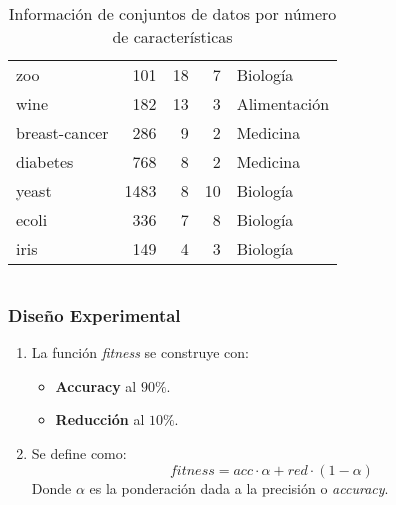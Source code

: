 \begin{frame}
\begin{columns}
\begin{table}[htp]
\begin{tabular}{ l r r r l }
        zoo              & 101            & 18            & 7             & Biología      \\
        wine             & 182            & 13            & 3             & Alimentación  \\
        breast-cancer    & 286            & 9             & 2             & Medicina      \\
        diabetes         & 768            & 8             & 2             & Medicina      \\
        yeast            & 1483           & 8             & 10            & Biología      \\
        ecoli            & 336            & 7             & 8             & Biología      \\
        iris             & 149            & 4             & 3             & Biología      \\ \hline
      \end{tabular}
      \caption{Información de conjuntos de datos por número de características}
      \label{tab:datasets_info}
    \end{table}
  \end{columns}
\end{frame}

\begin{frame}
  \frametitle{Diseño Experimental}
  \begin{enumerate}
    \item La función \textit{fitness} se construye con:
          \begin{itemize}
            \item \textbf{Accuracy} al $90\%$.
            \item \textbf{Reducción} al $10\%$.
          \end{itemize}
    \item Se define como: \begin{equation}
            fitness = acc\cdot\alpha + red\cdot(1-\alpha)
            \label{eq:fitness}
          \end{equation}
          Donde $\alpha$ es la ponderación dada a la precisión o \textit{accuracy}.
  \end{enumerate}
\end{frame}